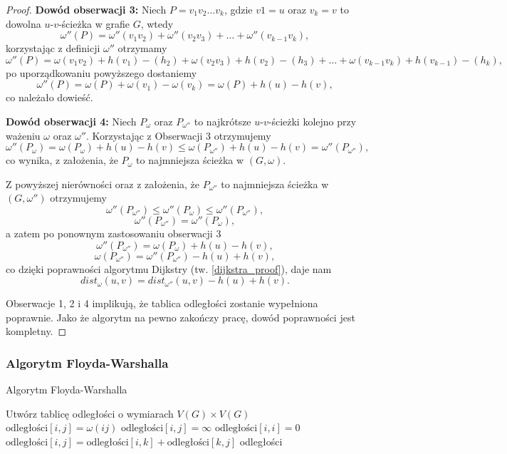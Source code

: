 \begin{theorem}
\begin{proof}
		\textbf{Dowód obserwacji 3:} Niech $P=v_1v_2\dots v_k$, 
		gdzie $v1 = u$ oraz $v_k = v$ to dowolna $u$-$v$-ścieżka
		w grafie $G$, wtedy 
		\[\omega''(P) = \omega''(v_1v_2) + \omega''(v_2v_3) + \dots + \omega''(v_{k-1}v_k),\]
		korzystając z definicji $\omega''$ otrzymamy
		\[\omega''(P) = \omega(v_1v_2) + h(v_1) - (h_2) + 
		\omega(v_2v_3) + h(v_2) - (h_3) + 
		\dots + \omega(v_{k-1}v_k) + h(v_{k-1}) - (h_k),\]
		po uporządkowaniu powyższego dostaniemy
		\[\omega''(P) = \omega(P) + \omega(v_1) - \omega(v_k) = \omega(P) + h(u) - h(v),\]
		co należało dowieść.
		
		\textbf{Dowód obserwacji 4:} Niech $P_{\omega}$ oraz 
		$P_{\omega''}$ to najkrótsze $u$-$v$-ścieżki kolejno 
		przy ważeniu $\omega$ oraz $\omega''$. Korzystając z 
		Obserwacji 3 otrzymujemy
		\[\omega''(P_{\omega}) = \omega(P_{\omega}) + h(u) - h(v) \leq
		\omega(P_{\omega''}) + h(u) - h(v) = \omega''(P_{\omega''}),\]
		co wynika, z założenia, że $P_{\omega}$ to 
		najmniejsza ścieżka w $(G, \omega)$. 
		
		Z powyższej nierówności oraz z założenia, że $P_{\omega''}$ to 
		najmniejsza ścieżka w $(G, \omega'')$ otrzymujemy
		\[\omega''(P_{\omega''}) \leq \omega''(P_{\omega}) \leq \omega''(P_{\omega''}), \]
		\[\omega''(P_{\omega''}) = \omega''(P_{\omega}),\]
		a zatem po ponownym zastosowaniu obserwacji 3
		\[\omega''(P_{\omega''}) = \omega(P_{\omega}) + h(u) - h(v),\]
		\[\omega(P_{\omega''}) = \omega''(P_{\omega''}) - h(u) + h(v),\]
		co dzięki poprawności algorytmu Dijkstry (tw. \ref{dijkstra_proof}),
		daje nam
		\[dist_{\omega}(u, v) = dist_{\omega''}(u, v) - h(u) + h(v).\]
		
		Obserwacje 1, 2 i 4 implikują, że tablica odległości zostanie
		wypełniona poprawnie. Jako że algorytm na pewno zakończy pracę,
		dowód poprawności jest kompletny.
	\end{proof} 
\end{theorem}

\subsubsection{Algorytm Floyda-Warshalla}
\begin{algorithm}[H]
	\caption{Algorytm Floyda-Warshalla}
	\begin{algorithmic}[1]
		\State Utwórz tablicę odległości o wymiarach $V(G) \times V(G)$
		\State $\text{odległości}[i, j] = \omega(ij)$
		\Else
		\State $\text{odległości}[i, j] = \infty$
		\EndIf
		\EndFor
		\EndFor
		\State $\text{odległości}[i, i] = 0$
		\EndFor
		\State $\text{odległości}[i, j] = \text{odległości}[i, k] + \text{odległości}[k, j]$
		\EndIf
		\EndFor
		\EndFor
		\EndFor
		\State \Return odległości
		\EndProcedure
	\end{algorithmic}
	\label{floydWarshall_alg}
\end{algorithm}

